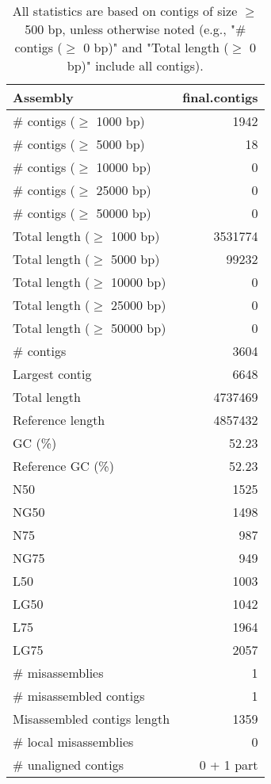 \documentclass[12pt,a4paper]{article}
\begin{document}
\begin{table}[ht]
\begin{center}
\caption{All statistics are based on contigs of size $\geq$ 500 bp, unless otherwise noted (e.g., "\# contigs ($\geq$ 0 bp)" and "Total length ($\geq$ 0 bp)" include all contigs).}
\begin{tabular}{|l*{1}{|r}|}
\hline
Assembly & final.contigs \\ \hline
\# contigs ($\geq$ 1000 bp) & 1942 \\ \hline
\# contigs ($\geq$ 5000 bp) & 18 \\ \hline
\# contigs ($\geq$ 10000 bp) & 0 \\ \hline
\# contigs ($\geq$ 25000 bp) & 0 \\ \hline
\# contigs ($\geq$ 50000 bp) & 0 \\ \hline
Total length ($\geq$ 1000 bp) & 3531774 \\ \hline
Total length ($\geq$ 5000 bp) & 99232 \\ \hline
Total length ($\geq$ 10000 bp) & 0 \\ \hline
Total length ($\geq$ 25000 bp) & 0 \\ \hline
Total length ($\geq$ 50000 bp) & 0 \\ \hline
\# contigs & 3604 \\ \hline
Largest contig & 6648 \\ \hline
Total length & 4737469 \\ \hline
Reference length & 4857432 \\ \hline
GC (\%) & 52.23 \\ \hline
Reference GC (\%) & 52.23 \\ \hline
N50 & 1525 \\ \hline
NG50 & 1498 \\ \hline
N75 & 987 \\ \hline
NG75 & 949 \\ \hline
L50 & 1003 \\ \hline
LG50 & 1042 \\ \hline
L75 & 1964 \\ \hline
LG75 & 2057 \\ \hline
\# misassemblies & 1 \\ \hline
\# misassembled contigs & 1 \\ \hline
Misassembled contigs length & 1359 \\ \hline
\# local misassemblies & 0 \\ \hline
\# unaligned contigs & 0 + 1 part \\ \hline

\end{tabular}
\end{center}
\end{table}
\end{document}
